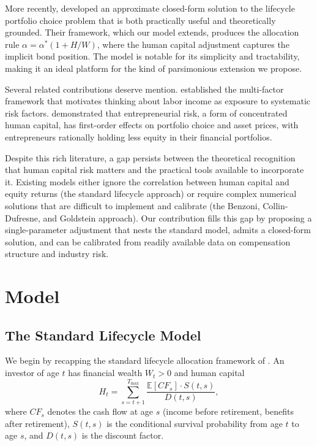 \documentclass[11pt]{article}
\begin{document}
More recently, \citet{choi2025} developed an approximate closed-form
solution to the lifecycle portfolio choice problem that is both practically
useful and theoretically grounded. Their framework, which our model extends,
produces the allocation rule $\alpha = \alpha^{*}(1 + H/W)$, where the
human capital adjustment captures the implicit bond position. The
\citet{choi2025} model is notable for its simplicity and tractability,
making it an ideal platform for the kind of parsimonious extension we
propose.

Several related contributions deserve mention. \citet{fama1993} established
the multi-factor framework that motivates thinking about labor income as
exposure to systematic risk factors. \citet{heaton2000} demonstrated that
entrepreneurial risk, a form of concentrated human capital, has
first-order effects on portfolio choice and asset prices, with
entrepreneurs rationally holding less equity in their financial portfolios.

Despite this rich literature, a gap persists between the theoretical
recognition that human capital risk matters and the practical tools
available to incorporate it. Existing models either ignore the correlation
between human capital and equity returns (the standard lifecycle approach)
or require complex numerical solutions that are difficult to implement and
calibrate (the Benzoni, Collin-Dufresne, and Goldstein approach). Our
contribution fills this gap by proposing a single-parameter adjustment that
nests the standard model, admits a closed-form solution, and can be
calibrated from readily available data on compensation structure and
industry risk.


\section{Model}\label{sec:model}

\subsection{The Standard Lifecycle Model}\label{sec:standard}

We begin by recapping the standard lifecycle allocation framework of
\citet{choi2025}. An investor of age $t$ has financial wealth $W_t > 0$
and human capital
\begin{equation}\label{eq:hc}
  H_t = \sum_{s=t+1}^{T_{\max}} \frac{\mathbb{E}[CF_s] \cdot S(t,s)}{D(t,s)},
\end{equation}
where $CF_s$ denotes the cash flow at age $s$ (income before retirement,
benefits after retirement), $S(t,s)$ is the conditional survival probability
from age $t$ to age $s$, and $D(t,s)$ is the discount factor.
\end{document}
